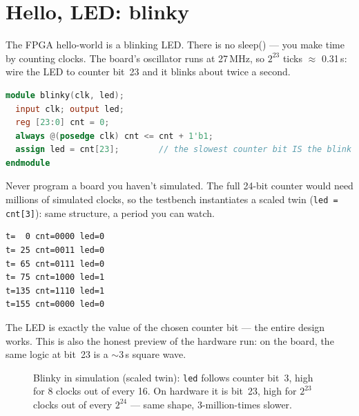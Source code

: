 \section{Hello, LED: blinky}

The FPGA hello-world is a blinking LED. There is no sleep() --- you make time
by counting clocks. The board's oscillator runs at 27\,MHz, so
$2^{23}$ ticks $\approx$ 0.31\,s: wire the LED to counter bit~23 and it blinks
about twice a second.

\begin{lstlisting}[language=Verilog]
module blinky(clk, led);
  input clk; output led;
  reg [23:0] cnt = 0;
  always @(posedge clk) cnt <= cnt + 1'b1;
  assign led = cnt[23];        // the slowest counter bit IS the blink
endmodule
\end{lstlisting}

\begin{example}
Never program a board you haven't simulated. The full 24-bit counter would
need millions of simulated clocks, so the testbench instantiates a scaled
twin (\texttt{led = cnt[3]}): same structure, a period you can watch.

\begin{lstlisting}
t=  0 cnt=0000 led=0
t= 25 cnt=0011 led=0
t= 65 cnt=0111 led=0
t= 75 cnt=1000 led=1
t=135 cnt=1110 led=1
t=155 cnt=0000 led=0
\end{lstlisting}

The LED is exactly the value of the chosen counter bit --- the entire design
works. This is also the honest preview of the hardware run: on the board, the
same logic at bit~23 is a $\sim$3\,s square wave.
\end{example}

\begin{figure}[htbp]\centering

\caption{Blinky in simulation (scaled twin): \texttt{led} follows counter
bit~3, high for 8 clocks out of every 16. On hardware it is bit~23, high for
$2^{23}$ clocks out of every $2^{24}$ --- same shape, 3-million-times slower.}
\label{fig:wave13}
\end{figure}

